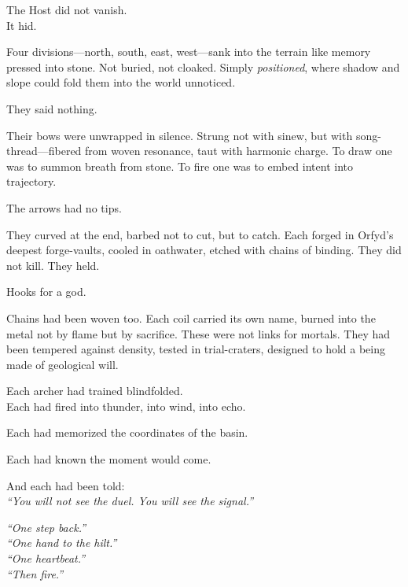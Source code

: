 \documentclass[12pt]{article}
\begin{document}
The Host did not vanish.\\
It hid.

\vspace{0.5em}
Four divisions---north, south, east, west---sank into the terrain like memory pressed into stone. Not buried, not cloaked. Simply \textit{positioned}, where shadow and slope could fold them into the world unnoticed.

\vspace{0.5em}
They said nothing.

\vspace{0.5em}
Their bows were unwrapped in silence. Strung not with sinew, but with song-thread---fibered from woven resonance, taut with harmonic charge. To draw one was to summon breath from stone. To fire one was to embed intent into trajectory.

\vspace{0.5em}
The arrows had no tips.

\vspace{0.5em}
They curved at the end, barbed not to cut, but to catch. Each forged in Orfyd’s deepest forge-vaults, cooled in oathwater, etched with chains of binding. They did not kill. They held.

\vspace{0.5em}
Hooks for a god.

\vspace{0.5em}
Chains had been woven too. Each coil carried its own name, burned into the metal not by flame but by sacrifice. These were not links for mortals. They had been tempered against density, tested in trial-craters, designed to hold a being made of geological will.

\vspace{0.5em}
Each archer had trained blindfolded.\\
Each had fired into thunder, into wind, into echo.

\vspace{0.5em}
Each had memorized the coordinates of the basin.

\vspace{0.5em}
Each had known the moment would come.

\vspace{0.5em}
And each had been told:\\
\textit{``You will not see the duel. You will see the signal.''}

\vspace{0.5em}
\textit{``One step back.''}\\
\textit{``One hand to the hilt.''}\\
\textit{``One heartbeat.''}\\
\textit{``Then fire.''}
\end{document}
